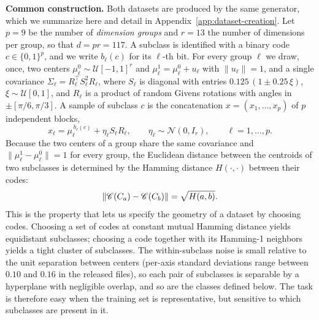 ﻿\documentclass[../ppgc-tese.tex]{subfiles}
\begin{document}
\noindent\textbf{Common construction.}
Both datasets are produced by the same generator, which we summarize here and detail in Appendix~\ref{app:dataset-creation}. Let $p = 9$ be the number of \emph{dimension groups} and $r = 13$ the number of dimensions per group, so that $d = pr = 117$. A subclass is identified with a binary code $c \in \{0,1\}^p$, and we write $b_\ell(c)$ for its $\ell$-th bit. For every group $\ell$ we draw, once, two centers $\mu_\ell^0 \sim \mathcal{U}[-1,1]^r$ and $\mu_\ell^1 = \mu_\ell^0 + u_\ell$ with $\|u_\ell\| = 1$, and a single covariance $\Sigma_\ell = R_\ell^\top S_\ell^2 R_\ell$, where $S_\ell$ is diagonal with entries $0.125\,(1 \pm 0.25\,\xi)$, $\xi \sim \mathcal{U}[0,1]$, and $R_\ell$ is a product of random Givens rotations with angles in $\pm[\pi/6, \pi/3]$. A sample of subclass $c$ is the concatenation $x = (x_1, \dots, x_p)$ of $p$ independent blocks,
\begin{equation}\label{eq:generator}
    x_\ell = \mu_\ell^{\,b_\ell(c)} + \eta_\ell S_\ell R_\ell,
    \qquad \eta_\ell \sim \mathcal{N}(0, I_r),
    \qquad \ell = 1, \dots, p.
\end{equation}
Because the two centers of a group share the same covariance and $\|\mu_\ell^1 - \mu_\ell^0\| = 1$ for every group, the Euclidean distance between the centroids of two subclasses is determined by the Hamming distance $H(\cdot,\cdot)$ between their codes:
\begin{equation}\label{eq:centroid-distance}
    \|\mathscr{C}({C_a}) - \mathscr{C}({C_b})\| = \sqrt{H(a, b)}.
\end{equation}
This is the property that lets us specify the geometry of a dataset by choosing codes. Choosing a set of codes at constant mutual Hamming distance yields equidistant subclasses; choosing a code together with its Hamming-1 neighbors yields a tight cluster of subclasses. The within-subclass noise is small relative to the unit separation between centers (per-axis standard deviations range between $0.10$ and $0.16$ in the released files), so each pair of subclasses is separable by a hyperplane with negligible overlap, and so are the classes defined below. The task is therefore easy when the training set is representative, but sensitive to which subclasses are present in it.
\end{document}
